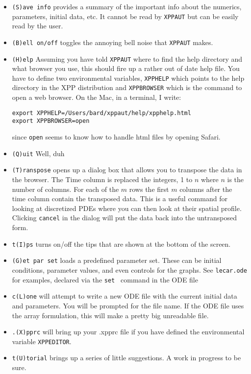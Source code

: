 \documentclass{article}
\begin{document}
\begin{itemize}
\item {\tt (S)ave info}  provides a summary of the important info about the numerics, parameters, initial data, etc.  It cannot be read by {\tt XPPAUT} but can be easily read by the user. 
\item {\tt (B)ell on/off} toggles the annoying bell noise that {\tt XPPAUT} makes.
\item {\tt (H)elp} Assuming you have told {\tt XPPAUT} where to find the help directory and what browser you use, this should fire up a rather out of date help file. You have to define two environmental variables, {\tt XPPHELP} which points to the help directory in the XPP distribution and {\tt XPPBROWSER} which is the command to open a web browser. On the Mac, in a terminal, I write:
\begin{verbatim}
export XPPHELP=/Users/bard/xppaut/help/xpphelp.html
export XPPBROWSER=open
\end{verbatim}
since {\tt open} seems to know how to handle html files by opening Safari.
\item{\tt (Q)uit} Well, duh
\item {\tt (T)ranspose} opens up a dialog box that allows you to transpose the data in the browser. The Time column is replaced the integers, 1 to $n$ where $n$ is the number of columns. For each of the $m$ rows the first $m$ columns after the time column contain the transposed data. This is a useful command for looking at discretized PDEs where you can then look at their spatial profile. Clicking {\tt cancel} in the dialog will put the data back into the untransposed form.
\item {\tt t(I)ps} turns on/off the tips that are shown at the bottom of the screen.
\item {\tt (G)et par set} loads a predefined parameter set. These can be initial conditions, parameter values, and even controls for the graphs. See {\tt lecar.ode} for examples, declared via the {\tt set } command in the ODE file
\item {\tt c(L)one} will attempt to write a new ODE file with the current initial data and parameters. You will be prompted for the file name. If the ODE file uses the array formulation, this will make a pretty big unreadable file.
\item {\tt .(X)pprc} will bring up your .xpprc file if you have defined the environmental variable {\tt XPPEDITOR}.
\item {\tt t(U)torial} brings up a series of little suggestions. A work in progress to be sure.
\end{itemize}
\end{document}
